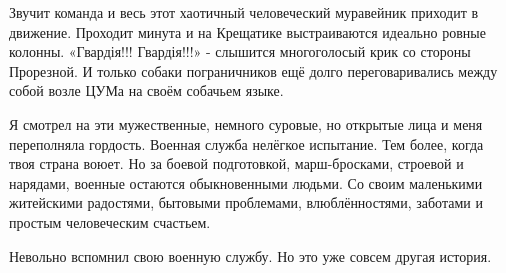 Звучит команда и весь этот хаотичный человеческий муравейник приходит в
движение. Проходит минута и на Крещатике выстраиваются идеально ровные колонны.
«Гвардія!!! Гвардія!!!» - слышится многоголосый крик со стороны Прорезной. И
только собаки пограничников ещё долго переговаривались между собой возле ЦУМа
на своём собачьем языке.

Я смотрел на эти мужественные, немного суровые, но открытые лица и меня
переполняла гордость. Военная служба нелёгкое испытание. Тем более, когда твоя
страна воюет. Но за боевой подготовкой, марш-бросками, строевой и нарядами,
военные остаются обыкновенными людьми. Со своим маленькими житейскими
радостями, бытовыми проблемами, влюблённостями, заботами и простым человеческим
счастьем.

Невольно вспомнил свою военную службу. Но это уже совсем другая история.
